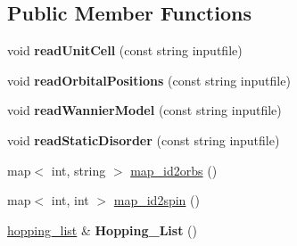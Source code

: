 \subsection*{Public Member Functions}
\begin{DoxyCompactItemize}
\item 
void {\bfseries read\+Unit\+Cell} (const string inputfile)\hypertarget{classtbmodel_adee0ff864c43723c8c979f4e2e008bb6}{}\label{classtbmodel_adee0ff864c43723c8c979f4e2e008bb6}

\item 
void {\bfseries read\+Orbital\+Positions} (const string inputfile)\hypertarget{classtbmodel_a1fce67740fd3fed482cd68357cdb9cbe}{}\label{classtbmodel_a1fce67740fd3fed482cd68357cdb9cbe}

\item 
void {\bfseries read\+Wannier\+Model} (const string inputfile)\hypertarget{classtbmodel_aeef6853760e7ce690be52bc5f52b6e72}{}\label{classtbmodel_aeef6853760e7ce690be52bc5f52b6e72}

\item 
void {\bfseries read\+Static\+Disorder} (const string inputfile)\hypertarget{classtbmodel_af9feab7007f63a5f150a02cc8bcf6fa0}{}\label{classtbmodel_af9feab7007f63a5f150a02cc8bcf6fa0}

\item 
map$<$ int, string $>$ \hyperlink{classtbmodel_a1285d524d1bc13a01ada7e3c401d9e9c}{map\+\_\+id2orbs} ()
\item 
map$<$ int, int $>$ \hyperlink{classtbmodel_a879c46b9c956e0fdeaa7e8f924773c6f}{map\+\_\+id2spin} ()
\item 
\hyperlink{classhopping__list}{hopping\+\_\+list} \& {\bfseries Hopping\+\_\+\+List} ()\hypertarget{classtbmodel_aada1c093588ba10a3a33e493b9264a4a}{}\label{classtbmodel_aada1c093588ba10a3a33e493b9264a4a}


\end{DoxyCompactItemize}
